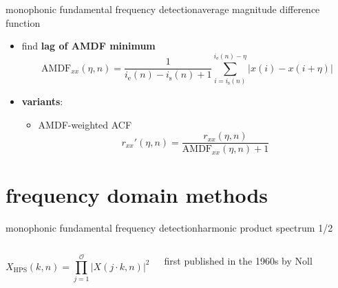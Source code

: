 	\begin{frame}{monophonic fundamental frequency detection}{average magnitude difference function}
        \begin{itemize}
            \item find \textbf{lag of AMDF minimum}
                \begin{equation*}
                    \mathrm{AMDF}_{xx}(\eta,n) = \frac{1}{i_{\mathrm{e}}(n)-i_{\mathrm{s}}(n)+1}\sum\limits_{i=i_{\mathrm{s}}(n)}^{i_{\mathrm{e}}(n)-\eta}{|x(i)- x(i+\eta)|} 
                \end{equation*}
            \item<2-> \textbf{variants}:
                \begin{itemize}
                    \item	AMDF-weighted ACF
                        \begin{equation*}
                            r_{xx}'(\eta,n) = \frac{r_{xx}(\eta,n)}{\mathrm{AMDF}_{xx}(\eta,n) + 1} 
                        \end{equation*}
                \end{itemize}
        \end{itemize}
	\end{frame}
	
    \section[frequency domain]{frequency domain methods}
	\begin{frame}{monophonic fundamental frequency detection}{harmonic product spectrum 1/2}
        \vspace{-10mm}
        \begin{columns}
                \vspace{4mm}
                \begin{equation*}\label{eq:hps}
                    X_{\mathrm{HPS}}(k,n) = \prod\limits_{j=1}^{\mathcal{O}}{|X(j\cdot k,n)|^2}
                \end{equation*}
                
                first published in the 1960s by Noll
		\end{columns}
        \vspace{-5mm}
	\end{frame}
	
